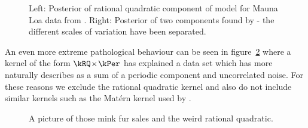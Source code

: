 \begin{figure}[ht]
\centering
{}
\caption{
Left: Posterior of rational quadratic component of model for Mauna Loa data from \citet{Duvenaud2013-dn}.
Right: Posterior of two components found by \procedurename{} - the different scales of variation have been separated.
}
\label{fig:rq}
\end{figure}

An even more extreme pathological behaviour can be seen in figure~\ref{fig:description:rq_per} where a kernel of the form $\kRQ \kerntimes \kPer$ has explained a data set which \procedurename{} has more naturally describes as a sum of a periodic component and uncorrelated noise.
For these reasons we exclude the rational quadratic kernel and also do not include similar kernels such as the Mat\'ern kernel \citep[e.g.][]{Rasmussen2006-ml} used by \citet{Kronberger_undated-vf}.

\begin{figure}[ht]
\centering
\caption{
A picture of those mink fur sales and the weird rational quadratic.
}
\label{fig:description:rq_per}
\end{figure}

